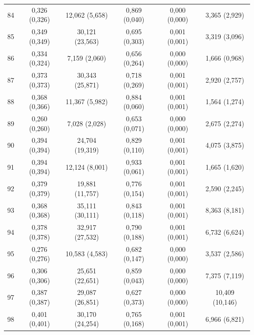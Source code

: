 \begin{tabular}{l c c c c c}
84 & 0,326 (0,326) & 12,062 (5,658) & 0,869 (0,040) & 0,000 (0,000) & 3,365 (2,929) \\
85 & 0,349 (0,349) & 30,121 (23,563) & 0,695 (0,303) & 0,001 (0,001) & 3,319 (3,096) \\
86 & 0,334 (0,324) & 7,159 (2,060) & 0,656 (0,264) & 0,000 (0,000) & 1,666 (0,968) \\
87 & 0,373 (0,373) & 30,343 (25,871) & 0,718 (0,269) & 0,001 (0,001) & 2,920 (2,757) \\
88 & 0,368 (0,366) & 11,367 (5,982) & 0,884 (0,060) & 0,001 (0,001) & 1,564 (1,274) \\
89 & 0,260 (0,260) & 7,028 (2,028) & 0,653 (0,071) & 0,000 (0,000) & 2,675 (2,274) \\
90 & 0,394 (0,394) & 24,704 (19,319) & 0,829 (0,110) & 0,001 (0,001) & 4,075 (3,875) \\
91 & 0,394 (0,394) & 12,124 (8,001) & 0,933 (0,061) & 0,001 (0,001) & 1,665 (1,620) \\
92 & 0,379 (0,379) & 19,881 (11,757) & 0,776 (0,154) & 0,001 (0,001) & 2,590 (2,245) \\
93 & 0,368 (0,368) & 35,111 (30,111) & 0,843 (0,118) & 0,001 (0,001) & 8,363 (8,181) \\
94 & 0,378 (0,378) & 32,917 (27,532) & 0,790 (0,188) & 0,001 (0,001) & 6,732 (6,624) \\
95 & 0,276 (0,276) & 10,583 (4,583) & 0,682 (0,147) & 0,000 (0,000) & 3,537 (2,586) \\
96 & 0,306 (0,306) & 25,651 (22,651) & 0,859 (0,043) & 0,000 (0,000) & 7,375 (7,119) \\
97 & 0,387 (0,387) & 29,087 (26,851) & 0,627 (0,373) & 0,000 (0,000) & 10,409 (10,146) \\
98 & 0,401 (0,401) & 30,170 (24,254) & 0,765 (0,168) & 0,001 (0,001) & 6,966 (6,821) \\
\hline 
 \end{tabular}
